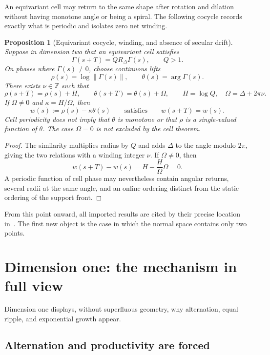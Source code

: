 \documentclass[10pt,a4paper]{article}
\theoremstyle{plain}
\newtheorem{proposition}[theorem]{Proposition}
\theoremstyle{definition}
\theoremstyle{remark}
\begin{document}
An equivariant cell may return to the same shape after rotation and dilation without having monotone angle or being a spiral. The following cocycle records exactly what is periodic and isolates zero net winding.

\begin{proposition}[Equivariant cocycle, winding, and absence of secular drift]
Suppose in dimension two that an equivariant cell satisfies
\[
  \Gamma(s+T)=Q R_\Delta\Gamma(s),
  \qquad Q>1.
\]
On phases where $\Gamma(s)\neq0$, choose continuous lifts
\[
  \rho(s)=\log\|\Gamma(s)\|,
  \qquad
  \theta(s)=\arg\Gamma(s).
\]
There exists $\nu\in\mathbb Z$ such that
\[
  \rho(s+T)=\rho(s)+H,
  \qquad
  \theta(s+T)=\theta(s)+\Omega,
  \qquad
  H=\log Q,
  \quad
  \Omega=\Delta+2\pi\nu.
\]
If $\Omega\neq0$ and $\kappa=H/\Omega$, then
\[
  w(s):=\rho(s)-\kappa\theta(s)
  \qquad\text{satisfies}\qquad
  w(s+T)=w(s).
\]
Cell periodicity does not imply that $\theta$ is monotone or that $\rho$ is a single-valued function of $\theta$. The case $\Omega=0$ is not excluded by the cell theorem.
\end{proposition}

\begin{proof}
The similarity multiplies radius by $Q$ and adds $\Delta$ to the angle modulo $2\pi$, giving the two relations with a winding integer $\nu$. If $\Omega\neq0$, then
\[
  w(s+T)-w(s)=H-\frac{H}{\Omega}\Omega=0.
\]
A periodic function of cell phase may nevertheless contain angular returns, several radii at the same angle, and an online ordering distinct from the static ordering of the support front.
\end{proof}

From this point onward, all imported results are cited by their precise location in~\cite{koch-cell}. The first new object is the case in which the normal space contains only two points.

\section{Dimension one: the mechanism in full view}

Dimension one displays, without superfluous geometry, why alternation, equal ripple, and exponential growth appear.

\subsection{Alternation and productivity are forced}
\end{document}
